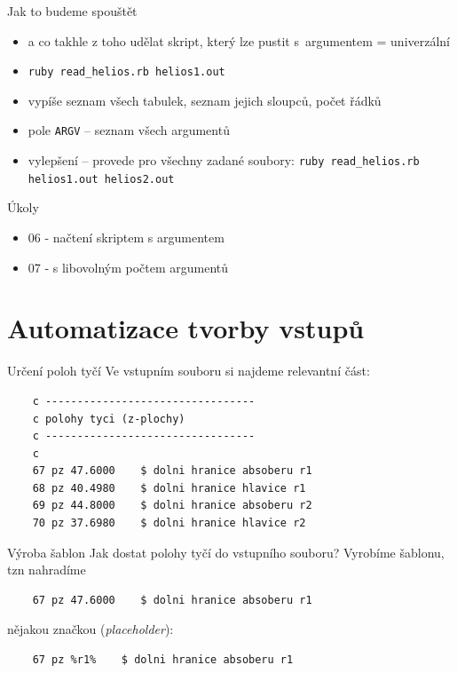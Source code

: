 \documentclass{beamer}
\begin{document}
\begin{frame}{Jak to budeme spouštět}
  \begin{itemize}
    \item a co takhle z toho udělat skript, který lze pustit s~argumentem = univerzální
    \item \texttt{ruby read\_helios.rb helios1.out}
    \item vypíše seznam všech tabulek, seznam jejich sloupců, počet řádků
    \item pole \texttt{ARGV} -- seznam všech argumentů
    \item vylepšení – provede pro všechny zadané soubory: \texttt{ruby read\_helios.rb helios1.out helios2.out}
  \end{itemize}
\end{frame}

\begin{frame}{Úkoly}
  \begin{itemize}
    \item 06 - načtení skriptem s argumentem
    \item 07 - s libovolným počtem argumentů
  \end{itemize}
\end{frame}

\section{Automatizace tvorby vstupů}

\begin{frame}[fragile]{Určení poloh tyčí}
  Ve vstupním souboru si najdeme relevantní část:
  \scriptsize
  \begin{verbatim}
    c ---------------------------------
    c polohy tyci (z-plochy)
    c ---------------------------------
    c
    67 pz 47.6000    $ dolni hranice absoberu r1
    68 pz 40.4980    $ dolni hranice hlavice r1
    69 pz 44.8000    $ dolni hranice absoberu r2
    70 pz 37.6980    $ dolni hranice hlavice r2
  \end{verbatim}
\end{frame}

\begin{frame}[fragile]{Výroba šablon}
  Jak dostat polohy tyčí do vstupního souboru? Vyrobíme šablonu, tzn nahradíme
  \begin{verbatim}
    67 pz 47.6000    $ dolni hranice absoberu r1
  \end{verbatim}
  \pause
  nějakou značkou (\emph{placeholder}):
  \begin{verbatim}
    67 pz %r1%    $ dolni hranice absoberu r1
  \end{verbatim}
\end{frame}
\end{document}
